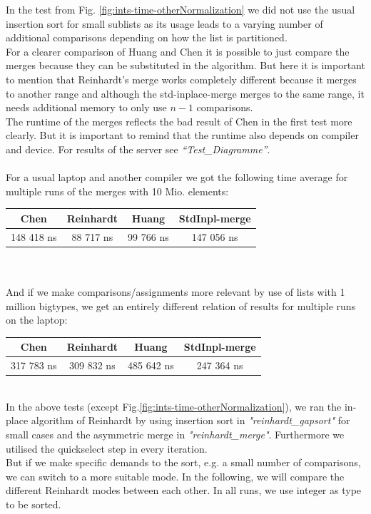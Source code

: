 \documentclass[11pt,pdftex,a4paper, twocolumn]{article}
\begin{document}
In the test from Fig. \ref{fig:ints-time-otherNormalization} we did not use the usual insertion sort for small sublists as its usage leads to a varying number of additional comparisons depending on how the list is partitioned. \\
For a clearer comparison of Huang and Chen it is possible to just compare the merges because they can be substituted in the algorithm. But here it is important to mention that Reinhardt’s merge works completely different because it merges to another range and although the std-inplace-merge merges to the same range, it needs additional memory to only use $ n-1 $ comparisons. \\
The runtime of the merges reflects the bad result of Chen in the first test more clearly. But it is important to remind that the runtime also depends on compiler and device. For results of the server see \textit{“Test\_Diagramme”}. \\
$ $ \\
For a usual laptop and another compiler we got the following time average for multiple runs of the merges with 10 Mio. elements: \\
\scriptsize
\begin{tabular}{|c|c|c|c|} \hline
Chen & Reinhardt & Huang & StdInpl-merge \\ \hline
148 418 ns & 88 717 ns & 99 766 ns & 147 056 ns \\ \hline
\end{tabular}
\normalsize \\
$ $ \\
And if we make comparisons/assignments more relevant by use of lists with 1 million bigtypes, we get an entirely different relation of results for multiple runs on the laptop: \\
\scriptsize
\begin{tabular}{|c|c|c|c|} \hline
Chen & Reinhardt & Huang & StdInpl-merge \\ \hline
317 783 ns & 309 832 ns & 485 642 ns & 247 364 ns \\ \hline
\end{tabular}
\normalsize \\
In the above tests (except Fig.\ref{fig:ints-time-otherNormalization}), we ran the in-place algorithm of Reinhardt by using insertion sort in \textit{"reinhardt\_gapsort"} for small cases and the asymmetric merge in \textit{"reinhardt\_merge"}. Furthermore we utilised the quickselect step in every iteration. \\
But if we make specific demands to the sort, e.g. a small number of comparisons, we can switch to a more suitable mode. In the following, we will compare the different Reinhardt modes between each other. In all runs, we use integer as type to be sorted. \\
\end{document}
